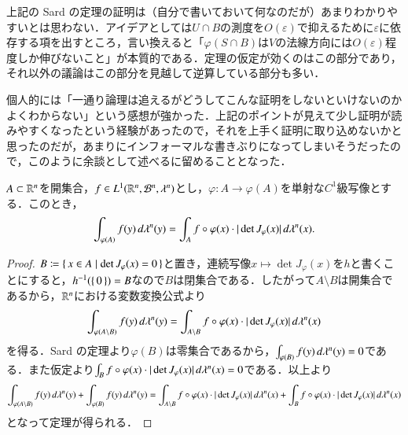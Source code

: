 \begin{dig}
上記の Sard の定理の証明は（自分で書いておいて何なのだが）あまりわかりやすいとは思わない．アイデアとしては$U \cap B$の測度を$O(\varepsilon)$で抑えるために$\varepsilon$に依存する項を出すところ，言い換えると「$\varphi(S \cap B)$は$V$の法線方向には$O(\varepsilon)$程度しか伸びないこと」が本質的である．定理の仮定が効くのはこの部分であり，それ以外の議論はこの部分を見越して逆算している部分も多い．

個人的には「一通り論理は追えるがどうしてこんな証明をしないといけないのかよくわからない」という感想が強かった．上記のポイントが見えて少し証明が読みやすくなったという経験があったので，それを上手く証明に取り込めないかと思ったのだが，あまりにインフォーマルな書きぶりになってしまいそうだったので，このように余談として述べるに留めることとなった．
\end{dig}

\begin{thm}$A \subset \mathbb{R}^n$を開集合，$f \in L^1(\mathbb{R}^n, \mathcal{B}^n ,\lambda^n)$とし，$\varphi \colon A \to \varphi(A)$を単射な$C^1$級写像とする．このとき，
\begin{equation}
\int_{\varphi(A)} f(y) \mathop{}\!d\lambda^n(y) = \int_A f \circ \varphi(x) \cdot | \det J_\varphi(x) | \mathop{}\!d \lambda^n(x).
\end{equation}
\end{thm}

\begin{proof}
$B \coloneqq \set{x \in A | \det J_\varphi(x) = 0}$と置き，連続写像$x \mapsto \det J_\varphi(x)$を$h$と書くことにすると，$h^{-1}(\set{0}) = B$なので$B$は閉集合である．したがって$A \setminus B$は開集合であるから，$\mathbb{R}^n$における変数変換公式より
\begin{equation}
\int_{\varphi(A \setminus B)} f(y) \mathop{}\!d\lambda^n(y) = \int_{A \setminus B} f \circ \varphi(x) \cdot | \det J_\varphi(x) | \mathop{}\!d \lambda^n(x)
\end{equation}を得る．Sard の定理より$\varphi(B)$は零集合であるから，$\int_{\varphi(B)} f(y) \mathop{}\!d\lambda^n(y) = 0$である．また仮定より$\int_{B} f \circ \varphi(x) \cdot | \det J_\varphi(x) | \mathop{}\!d \lambda^n(x) = 0$である．以上より
\begin{equation}
\int_{\varphi(A \setminus B)} f(y) \mathop{}\!d\lambda^n(y) + \int_{\varphi(B)} f(y) \mathop{}\!d\lambda^n(y) = \int_{A \setminus B} f \circ \varphi(x) \cdot | \det J_\varphi(x) | \mathop{}\!d \lambda^n(x) + \int_{B} f \circ \varphi(x) \cdot | \det J_\varphi(x) | \mathop{}\!d \lambda^n(x)
\end{equation}となって定理が得られる．
\end{proof}

